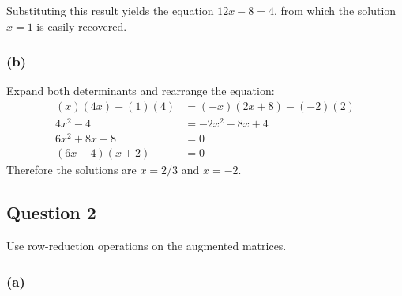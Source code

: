 \documentclass{article}
\begin{document}
Substituting this result yields the equation $12x - 8 = 4$, from which the 
solution $x = 1$ is easily recovered.

\subsubsection*{(b)}
Expand both determinants and rearrange the equation:
\begin{align*}
 (x)(4x) - (1)(4) &= (-x)(2x+8) - (-2)(2) \\
 4x^2 - 4 &= -2x^2 - 8x + 4 \\
 6x^2 + 8x - 8 &= 0 \\
 (6x - 4)(x + 2) &= 0
\end{align*}
Therefore the solutions are $x = 2/3$ and $x = -2$.

\subsection*{Question 2}
Use row-reduction operations on the augmented matrices.

\subsubsection*{(a)}
\end{document}
